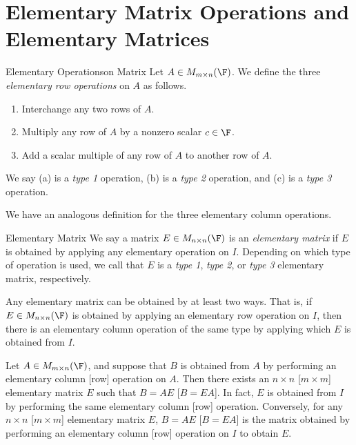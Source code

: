 \documentclass[linearalgebra]{subfiles}
\begin{document}

    \section{Elementary Matrix Operations and Elementary Matrices}

    \begin{definition}{Elementary Operations}{on Matrix}
        Let $A\in M_{m\times n}(\F)$. We define the three \emph{elementary row operations} on $A$ as follows.

        \begin{enumerate}
            \item Interchange any two rows of $A$.
            \item Multiply any row of $A$ by a nonzero scalar $c\in \F$.
            \item Add a scalar multiple of any row of $A$ to another row of $A$.
        \end{enumerate}
        We say (a) is a \emph{type 1} operation, (b) is a \emph{type 2} operation, and (c) is a \emph{type 3} operation.
    \end{definition}

    \begin{remark}
        We have an analogous definition for the three elementary column operations.
    \end{remark}

    \begin{definition}{Elementary Matrix}{}
        We say a matrix $E\in M_{n\times n}(\F)$ is an \emph{elementary matrix} if $E$ is obtained by applying any elementary operation on $I$. Depending on which type of operation is used, we call that $E$ is a \emph{type 1}, \emph{type 2}, or \emph{type 3} elementary matrix, respectively.
    \end{definition}
    
    \begin{remark}
        Any elementary matrix can be obtained by at least two ways. That is, if $E\in M_{n\times n}(\F)$ is obtained by applying an elementary row operation on $I$, then there is an elementary column operation of the same type by applying which $E$ is obtained from $I$.
    \end{remark}

    \begin{theorem}{}
        Let $A\in M_{m\times n}(\F)$, and suppose that $B$ is obtained from $A$ by performing an elementary column [row] operation on $A$. Then there exists an $n\times n$ [$m\times m$] elementary matrix $E$ such that $B=AE$ [$B=EA$]. In fact, $E$ is obtained from $I$ by performing the same elementary column [row] operation. Conversely, for any $n\times n$ [$m\times m$] elementary matrix $E$, $B=AE$ [$B=EA$] is the matrix obtained by performing an elementary column [row]
        operation on $I$ to obtain $E$.
    \end{theorem}
\end{document}
